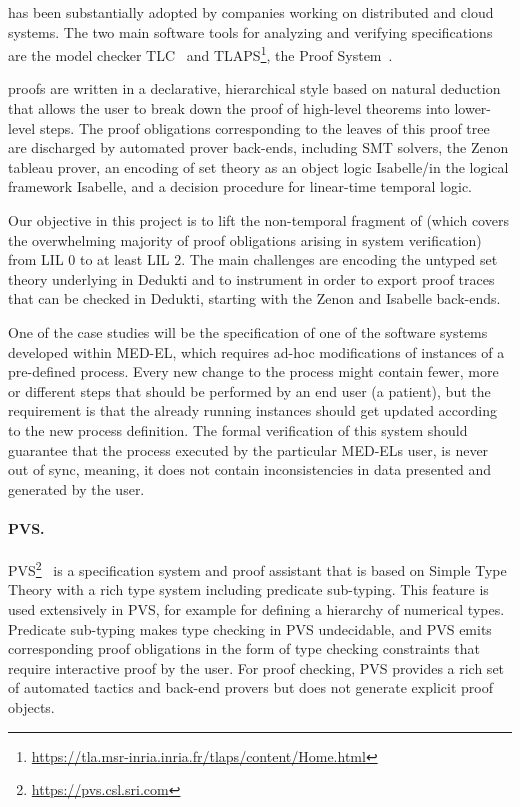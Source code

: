 \tlaplus\cite{lamport:specifying} has been substantially adopted by
companies working on distributed and cloud
systems\cite{newcombe:amazon-cacm}. The two main software tools for
analyzing and verifying \tlaplus specifications are the model checker
TLC~\cite{yu:model-checking} and
TLAPS\footnote{\url{https://tla.msr-inria.inria.fr/tlaps/content/Home.html}},
the \tlaplus Proof System~\cite{cousineau:tla-proofs}.

\tlaplus proofs are written in a declarative, hierarchical style based on
natural deduction that allows the user to break down the proof of high-level
theorems into lower-level steps. The proof obligations corresponding to the
leaves of this proof tree are discharged by automated prover back-ends,
including SMT solvers, the Zenon tableau prover, an encoding of \tlaplus set
theory as an object logic Isabelle/\tlaplus in the logical framework Isabelle,
and a decision procedure for linear-time temporal logic.

Our objective in this project is to lift the non-temporal fragment of
\tlaplus (which covers the overwhelming majority of proof obligations
arising in system verification) from LIL $0$ to at least LIL $2$. The main
challenges are encoding the untyped set theory underlying \tlaplus in
Dedukti and to instrument \tlaplus in order
to export proof traces that can be checked in Dedukti, starting with
the Zenon and Isabelle back-ends.

One of the case studies will be the specification of one of the software
systems developed within MED-EL, which requires ad-hoc modifications of
instances of a pre-defined process. Every new change to the process might
contain fewer, more or different steps that should be performed by an end user
(a patient), but the requirement is that the already running instances
should get updated according to the new process definition. The formal
verification of this system should guarantee that the process executed by the
particular MED-ELs user, is never out of sync, meaning, it does not contain
inconsistencies in data presented and generated by the user.

\paragraph*{PVS.}
PVS\footnote{\url{https://pvs.csl.sri.com}}~\cite{owre:pvs} is a specification
system and proof assistant that is based on Simple Type Theory with a rich type
system including predicate sub-typing. This feature is used extensively in PVS,
for example for defining a hierarchy of numerical types. Predicate sub-typing
makes type checking in PVS undecidable, and PVS emits corresponding proof
obligations in the form of type checking constraints that require
interactive proof by the user. For proof checking, PVS provides a rich set of
automated tactics and back-end provers but does not generate explicit proof
objects.

